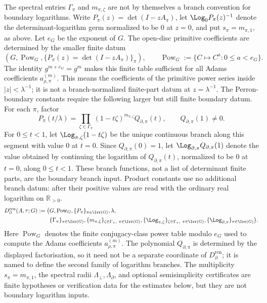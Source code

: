 \begin{definition}
  The spectral entries \(\Gamma_\pi\) and \(m_{\pi,\zeta}\) are not by
  themselves a branch convention for boundary logarithms.  Write
  \(P_\pi(z)=\det(I-zA_\pi)\), let \(\Log_0 P_\pi(z)^{-1}\) denote the
  determinant-logarithm germ normalized to be \(0\) at \(z=0\), and put
  \(s_\pi=m_{\pi,1}\), as above.  Let \(e_G\) be the exponent of \(G\).
  The open-disc primitive coefficients are determined by the smaller finite
  datum
  \[
    (G,\operatorname{Pow}_{G},\{P_\pi(z)=\det(I-zA_\pi)\}_\pi),
    \qquad
    \operatorname{Pow}_{G}:=\{C\mapsto C^a:0\le a<e_G\}.
  \]
  The identity \(g^{m+e_G}=g^m\) makes this finite table sufficient for all
  Adams coefficients \(a_{\rho,\pi}^{(m)}\).
  This means the coefficients of the primitive power series inside
  \(|z|<\lambda^{-1}\); it is not a branch-normalized finite-part datum at
  \(z=\lambda^{-1}\).
  The Perron-boundary constants require the following larger but still finite
  boundary datum.  For each \(\pi\), factor
  \begin{equation}\label{eq:perron-boundary-factorization-local}
    P_\pi(t/\lambda)
    =
    \prod_{\zeta\in\Gamma_\pi}(1-t\zeta)^{m_{\pi,\zeta}}
      Q_{\partial,\pi}(t),
    \qquad Q_{\partial,\pi}(1)\ne0 .
  \end{equation}
  For \(0\le t<1\), let
  \(\Log_{\pi,\zeta}(1-t\zeta)\) be the unique continuous branch along this
  segment with value \(0\) at \(t=0\).  Since \(Q_{\partial,\pi}(0)=1\),
  let \(\Log_{\partial,\pi}Q_{\partial,\pi}(1)\) denote the value obtained by
  continuing the logarithm of \(Q_{\partial,\pi}(t)\), normalized to be \(0\)
  at \(t=0\), along \(0\le t<1\).  These branch functions, not a list of
  determinant finite parts, are the boundary branch input.  Product constants
  use no additional branch datum: after
   their positive values are read
  with the ordinary real logarithm on \(\mathbb R_{>0}\).
  \begin{equation}\label{eq:perron-boundary-renormalized-data-local}
  \begin{aligned}
    D_{\partial}^{\mathrm{ren}}(A,\tau;G)
    :=
    \bigl(&G,\operatorname{Pow}_{G},\{P_\pi\}_{\pi\in\Irr(G)},\lambda,\\
      &\{\Gamma_\pi\}_{\pi\in\Irr(G)},
        \{m_{\pi,\zeta}\}_{\zeta\in\Gamma_\pi,\ \pi\in\Irr(G)},
        \{\Log_{\pi,\zeta}\}_{\zeta\in\Gamma_\pi,\ \pi\in\Irr(G)},
        \{\Log_{\partial,\pi}\}_{\pi\in\Irr(G)}\bigr).
  \end{aligned}
  \end{equation}
  Here \(\operatorname{Pow}_{G}\) denotes the finite conjugacy-class power
  table modulo \(e_G\) used to compute the Adams coefficients
  \(a_{\rho,\pi}^{(m)}\).  The polynomial \(Q_{\partial,\pi}\) is determined
  by the displayed factorisation, so it need not be a separate coordinate of
  \(D_{\partial}^{\mathrm{ren}}\); it is named to define the second family of
  logarithm branches.  The multiplicity
  \(s_\pi=m_{\pi,1}\), the spectral radii
  \(\Lambda_\perp,\Lambda_\partial\), and optional semisimplicity certificates
  are finite hypotheses or verification data for the estimates below, but they
  are not boundary logarithm inputs.


\end{definition}
